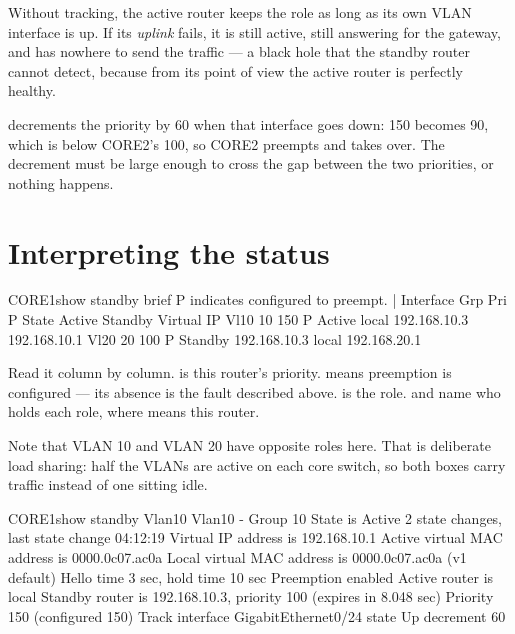 \begin{conceptbox}
Without tracking, the active router keeps the role as long as its own VLAN
interface is up. If its \emph{uplink} fails, it is still active, still answering
for the gateway, and has nowhere to send the traffic --- a black hole that the
standby router cannot detect, because from its point of view the active router is
perfectly healthy.

 decrements the priority by 60 when that
interface goes down: 150 becomes 90, which is below CORE2's 100, so CORE2
preempts and takes over. The decrement must be large enough to cross the gap
between the two priorities, or nothing happens.
\end{conceptbox}

\section{Interpreting the status}

\begin{verify}{CORE1}{show standby brief}
                     P indicates configured to preempt.
                     |
Interface   Grp  Pri P State    Active          Standby         Virtual IP
Vl10        10   150 P Active   local           192.168.10.3    192.168.10.1
Vl20        20   100 P Standby  192.168.10.3    local           192.168.20.1
\end{verify}

Read it column by column.  is this router's priority.  means
preemption is configured --- its absence is the fault described above.
 is the role.  and  name who holds each role,
where  means this router.

Note that VLAN 10 and VLAN 20 have opposite roles here. That is deliberate load
sharing: half the VLANs are active on each core switch, so both boxes carry
traffic instead of one sitting idle.

\begin{verify}{CORE1}{show standby Vlan10}
Vlan10 - Group 10
  State is Active
    2 state changes, last state change 04:12:19
  Virtual IP address is 192.168.10.1
  Active virtual MAC address is 0000.0c07.ac0a
    Local virtual MAC address is 0000.0c07.ac0a (v1 default)
  Hello time 3 sec, hold time 10 sec
  Preemption enabled
  Active router is local
  Standby router is 192.168.10.3, priority 100 (expires in 8.048 sec)
  Priority 150 (configured 150)
    Track interface GigabitEthernet0/24 state Up decrement 60
\end{verify}

